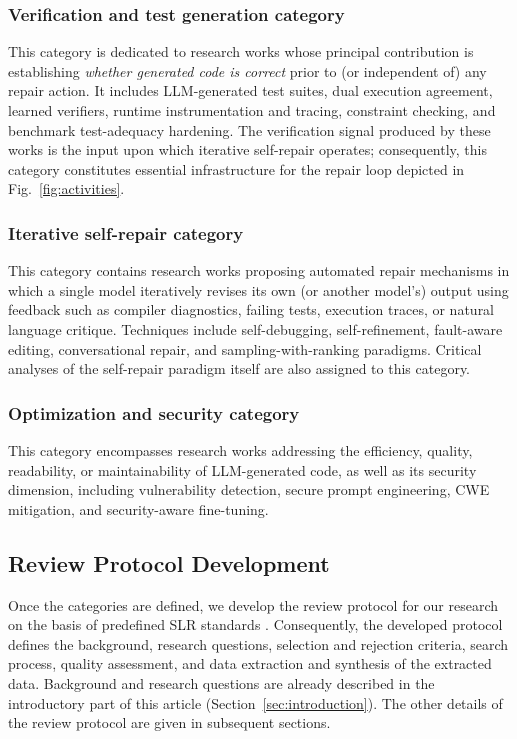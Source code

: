 \documentclass[10pt,a4paper]{article}
\begin{document}
\subsubsection{Verification and test generation category}
\label{sec:cat_verification}
This category is dedicated to research works whose principal contribution is establishing \textit{whether generated code is correct} prior to (or independent of) any repair action. It includes LLM-generated test suites, dual execution agreement, learned verifiers, runtime instrumentation and tracing, constraint checking, and benchmark test-adequacy hardening. The verification signal produced by these works is the input upon which iterative self-repair operates; consequently, this category constitutes essential infrastructure for the repair loop depicted in Fig.~\ref{fig:activities}.

\subsubsection{Iterative self-repair category}
\label{sec:cat_repair}
This category contains research works proposing automated repair mechanisms in which a single model iteratively revises its own (or another model's) output using feedback such as compiler diagnostics, failing tests, execution traces, or natural language critique. Techniques include self-debugging, self-refinement, fault-aware editing, conversational repair, and sampling-with-ranking paradigms. Critical analyses of the self-repair paradigm itself are also assigned to this category.

\subsubsection{Optimization and security category}
\label{sec:cat_optsec}
This category encompasses research works addressing the efficiency, quality, readability, or maintainability of LLM-generated code, as well as its security dimension, including vulnerability detection, secure prompt engineering, CWE mitigation, and security-aware fine-tuning.

\subsection{Review Protocol Development}
\label{sec:protocol}
Once the categories are defined, we develop the review protocol for our research on the basis of predefined SLR standards \cite{kitchenham2004,rashid2015}. Consequently, the developed protocol defines the background, research questions, selection and rejection criteria, search process, quality assessment, and data extraction and synthesis of the extracted data. Background and research questions are already described in the introductory part of this article (Section~\ref{sec:introduction}). The other details of the review protocol are given in subsequent sections.
\end{document}

